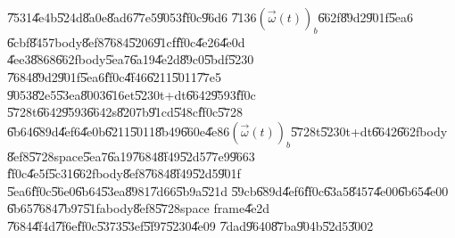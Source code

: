 \documentclass[12pt]{article}
\begin{document}

\U{7531}\U{4e4b}\U{524d}\U{8a0e}\U{8ad6}\U{77e5}\U{9053}\U{ff0c}\U{96d6}%
\U{7136}$\left( \vec{\omega}(t)\right) _{b}$\U{662f}\U{89d2}\U{901f}\U{5ea6}%
\U{6cbf}\U{8457}body\U{8ef8}\U{7684}\U{5206}\U{91cf}\U{ff0c}\U{4e26}\U{4e0d}%
\U{4ee3}\U{8868}\U{662f}body\U{5ea7}\U{6a19}\U{4e2d}\U{89c0}\U{5bdf}\U{5230}%
\U{7684}\U{89d2}\U{901f}\U{5ea6}\U{ff0c}\U{4f46}\U{6211}\U{5011}\U{77e5}%
\U{9053}\U{82e5}\U{53ea}\U{8003}\U{616e}t\U{5230}t+dt\U{6642}\U{9593}\U{ff0c}%
\U{5728}t\U{6642}\U{9593}\U{6642}s\U{8207}b\U{91cd}\U{548c}\U{ff0c}\U{5728}%
\U{6b64}\U{689d}\U{4ef6}\U{4e0b}\U{6211}\U{5011}\U{8b49}\U{660e}\U{4e86}$%
\left( \vec{\omega}(t)\right) _{b}$\U{5728}t\U{5230}t+dt\U{6642}\U{662f}body%
\U{8ef8}\U{5728}space\U{5ea7}\U{6a19}\U{7684}\U{8f49}\U{52d5}\U{77e9}\U{9663}%
\U{ff0c}\U{4e5f}\U{5c31}\U{662f}body\U{8ef8}\U{7684}\U{8f49}\U{52d5}\U{901f}%
\U{5ea6}\U{ff0c}\U{56e0}\U{6b64}\U{53ea}\U{8981}\U{7d66}\U{5b9a}\U{521d}%
\U{59cb}\U{689d}\U{4ef6}\U{ff0c}\U{63a5}\U{8457}\U{4e00}\U{6b65}\U{4e00}%
\U{6b65}\U{7684}\U{7b97}\U{51fa}body\U{8ef8}\U{5728}space frame\U{4e2d}%
\U{7684}\U{4f4d}\U{7f6e}\U{ff0c}\U{5373}\U{53ef}\U{5f97}\U{5230}\U{4e09}%
\U{7dad}\U{9640}\U{87ba}\U{904b}\U{52d5}\U{3002}\bigskip 
\end{document}
